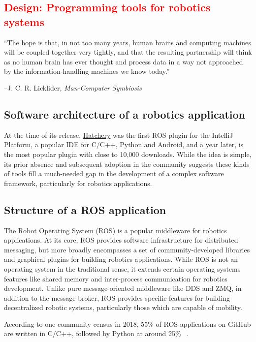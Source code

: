 \documentclass[12pt,initial,twoside,maitrise]{dms}
\newcommand{\rare}[1]{\textcolor{red}{#1}}
\numberwithin{equation}{section}
\numberwithin{table}{chapter}
\numberwithin{figure}{chapter}
\begin{document}
\rare{\chapter{Design: Programming tools for robotics systems}\label{ch:hatchery}}
\setlength{\epigraphwidth}{0.78\textwidth}
\epigraph{``The hope is that, in not too many years, human brains and computing machines will be coupled together very tightly, and that the resulting partnership will think as no human brain has ever thought and process data in a way not approached by the information-handling machines we know today.''}{\begin{flushright}--J. C. R. Licklider, \textit{Man-Computer Symbiosis}~\cite{licklider1960man}\end{flushright}}

\section{Software architecture of a robotics application}

At the time of its release, \href{https://github.com/duckietown/hatchery}{Hatchery} was the first ROS plugin for the IntelliJ Platform, a popular IDE for C/C++, Python and Android, and a year later, is the most popular plugin with close to 10,000 downloads. While the idea is simple, its prior absence and subsequent adoption in the community suggests these kinds of tools fill a much-needed gap in the development of a complex software framework, particularly for robotics applications.

\section{Structure of a ROS application}

The Robot Operating System (ROS) is a popular middleware for robotics applications. At its core, ROS provides software infrastructure for distributed messaging, but more broadly encompasses a set of community-developed libraries and graphical plugins for building robotics applications. While ROS is not an operating system in the traditional sense, it extends certain operating systems features like shared memory and inter-process communication for robotics development. Unlike pure message-oriented middleware like DDS and ZMQ, in addition to the message broker, ROS provides specific features for building decentralized robotic systems, particularly those which are capable of mobility.

According to one community census in 2018, 55\% of ROS applications on GitHub are written in C/C++, followed by Python at around 25\% ~\cite{Areserio54:online}.
\end{document}
